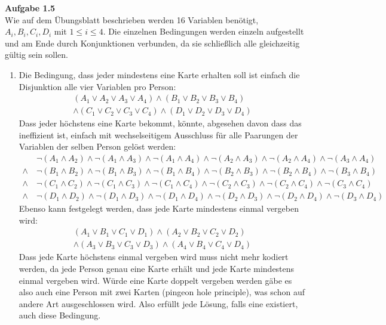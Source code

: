 \documentclass[a4paper,10pt]{article}
\begin{document}
\noindent\textbf{Aufgabe 1.5}\\
Wie auf dem Übungsblatt beschrieben werden 16 Variablen benötigt, $A_i, B_i, C_i, D_i$ mit $1 \leq i \leq 4$. Die einzelnen Bedingungen werden einzeln aufgestellt und am Ende durch Konjunktionen verbunden, da sie schließlich alle gleichzeitig gültig sein sollen.
\begin{enumerate}
\item Die Bedingung, dass jeder mindestens eine Karte erhalten soll ist einfach  die Disjunktion alle vier Variablen pro Person:
\begin{align*}
(A_1 \vee A_2 \vee A_3 \vee A_4) \wedge (B_1 \vee B_2 \vee B_3 \vee B_4) \\\wedge (C_1 \vee C_2 \vee C_3 \vee C_4) \wedge (D_1 \vee D_2 \vee D_3 \vee D_4)
\end{align*}
Dass jeder höchstens eine Karte bekommt, könnte, abgesehen davon dass das ineffizient ist, einfach mit wechselseitigem Ausschluss für alle Paarungen der Variablen der selben Person gelöst werden: 
\begin{align*}
& \neg(A_1 \wedge A_2) \wedge \neg (A_1 \wedge A_3) \wedge \neg (A_1 \wedge A_4) \wedge \neg (A_2 \wedge A_3) \wedge \neg (A_2 \wedge A_4) \wedge \neg (A_3 \wedge A_4) \\
\wedge~ & \neg(B_1 \wedge B_2) \wedge \neg (B_1 \wedge B_3) \wedge \neg (B_1 \wedge B_4) \wedge \neg (B_2 \wedge B_3) \wedge \neg (B_2 \wedge B_4) \wedge \neg (B_3 \wedge B_4) \\
\wedge~ & \neg(C_1 \wedge C_2) \wedge \neg (C_1 \wedge C_3) \wedge \neg (C_1 \wedge C_4) \wedge \neg (C_2 \wedge C_3) \wedge \neg (C_2 \wedge C_4) \wedge \neg (C_3 \wedge C_4) \\
\wedge~ & \neg(D_1 \wedge D_2) \wedge \neg (D_1 \wedge D_3) \wedge \neg (D_1 \wedge D_4) \wedge \neg (D_2 \wedge D_3) \wedge \neg (D_2 \wedge D_4) \wedge \neg (D_3 \wedge D_4)
\end{align*}
Ebenso kann festgelegt werden, dass jede Karte mindestens einmal vergeben wird:
\begin{align*}
(A_1 \vee B_1 \vee C_1 \vee D_1) \wedge (A_2 \vee B_2 \vee C_2 \vee D_2) \\\wedge (A_3 \vee B_3 \vee C_3 \vee D_3) \wedge (A_4 \vee B_4 \vee C_4 \vee D_4) 
\end{align*}
Dass jede Karte höchstens einmal vergeben wird muss nicht mehr kodiert werden, da jede Person genau eine Karte erhält und jede Karte mindestens einmal vergeben wird. Würde eine Karte doppelt vergeben werden gäbe es also auch eine Person mit zwei Karten (pingeon hole principle), was schon auf andere Art ausgeschlossen wird. Also erfüllt jede Lösung, falls eine existiert, auch diese Bedingung.


\end{enumerate}
\end{document}
